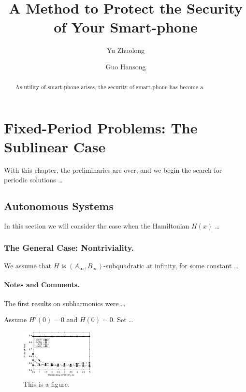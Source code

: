 \documentclass{llncs}
\begin{document}
  \title{A Method to Protect the Security of Your Smart-phone}
  \author{Yu Zhuolong \and Guo Hansong}
  \maketitle
  \begin{abstract}
    As utility of smart-phone arises, the security of smart-phone has become a.
  \end{abstract}
  \section{Fixed-Period Problems: The Sublinear Case}
  With this chapter, the preliminaries are over, and we begin the search for periodic solutions \dots
  \subsection{Autonomous Systems}
  In this section we will consider the case when the Hamiltonian $H(x)$ \dots
  \subsubsection{The General Case: Nontriviality.}
  We assume that $H$ is
  $\left(A_{\infty}, B_{\infty}\right)$-subqua\-dra\-tic at infinity, for some constant \dots
  \paragraph{Notes and Comments.}
  The first results on subharmonics were \dots
  \begin{proposition}
    Assume $H'(0)=0$ and $ H(0)=0$. Set \dots
  \end{proposition}
  
  \begin{figure}
    \begin{center}
    \includegraphics[height=2.5cm]{12.eps}
    \end{center}
    \caption{This is a figure.}
  \end{figure}
  
\end{document}
